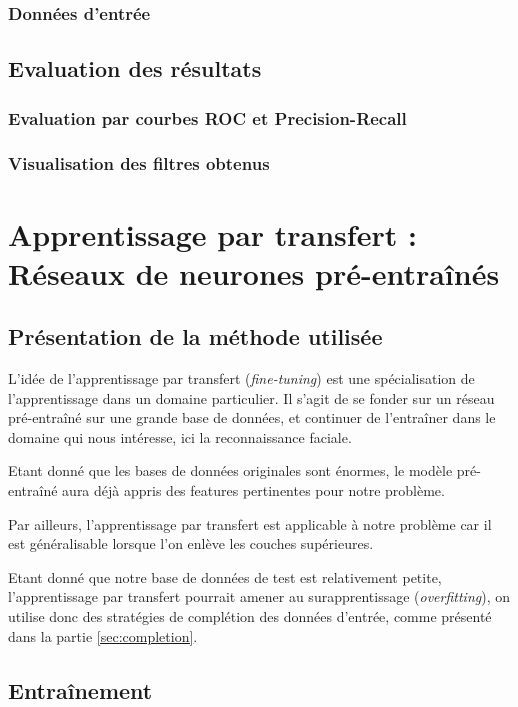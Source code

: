\documentclass[a4paper,11pt]{article}
\begin{document}
    \subsubsection{Données d'entrée}


\subsection{Evaluation des résultats}
\subsubsection{Evaluation par courbes ROC et Precision-Recall}
\subsubsection{Visualisation des filtres obtenus}

\section{Apprentissage par transfert : Réseaux de neurones pré-entraînés}
\subsection{Présentation de la méthode utilisée}

L'idée de l'apprentissage par transfert (\textit{fine-tuning}) est une spécialisation de
l'apprentissage dans un domaine particulier. Il s'agit de se fonder sur un réseau pré-entraîné sur
une grande base de données, et continuer de l'entraîner dans le domaine qui nous intéresse, ici la reconnaissance faciale.

Etant donné que les bases de données originales sont énormes, le modèle pré-entraîné aura déjà appris des features pertinentes pour notre problème.

Par ailleurs, l'apprentissage par transfert est applicable à notre problème car il est généralisable
lorsque l'on enlève les couches supérieures.

Etant donné que notre base de données de test est relativement petite, l'apprentissage par transfert pourrait amener au surapprentissage (\textit{overfitting}), on utilise donc des stratégies de complétion des données d'entrée, comme présenté dans la partie \ref{sec:completion}.

    \subsection{Entraînement}
\end{document}
